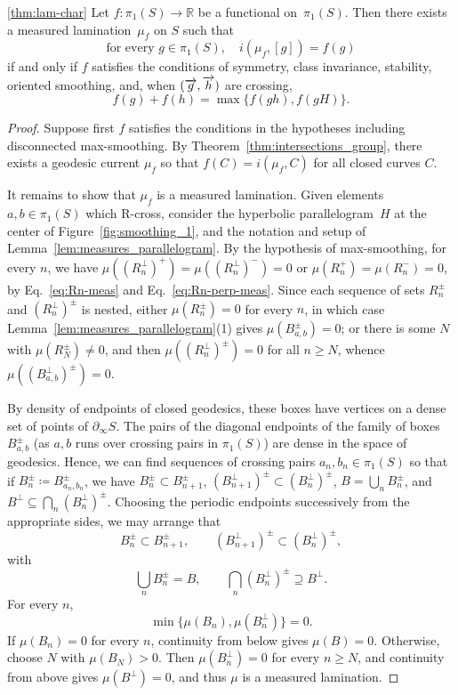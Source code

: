 \begin{taggedthm}{\ref{thm:lam-char}}
Let $f \colon \pi_1(S) \to \mathbb{R}$ be a functional on~$\pi_1(S)$.
Then there exists a measured lamination~$\mu_{f}$ on $S$ such that
\[
\text{for every } g\in \pi_1(S),\quad
i(\mu_{f},[g])=f(g)
\]
if and only if $f$ satisfies the conditions of symmetry, class invariance,
stability, oriented smoothing,
and, when $(\overrightarrow{g}, \overrightarrow{h})$ are crossing,
\[
f(g)+f(h)=\max\{f(gh),f(gH)\}.
\]
\end{taggedthm}

\begin{proof}
Suppose first $f$ satisfies the conditions in the hypotheses including
disconnected max-smoothing.
By Theorem~\ref{thm:intersections_group}, there exists a geodesic current $\mu_f$ so that $f(C)=i(\mu_f,C)$ for all closed curves $C$.

It remains to show that $\mu_f$ is a measured lamination.
Given elements $a, b \in \pi_1(S)$ which R-cross,
consider the hyperbolic parallelogram~$H$ at the center of
Figure~\ref{fig:smoothing_1}, and the notation and setup of Lemma~\ref{lem:measures_parallelogram}.
By the hypothesis of max-smoothing, for every $n$, we have $\mu((R_n^\perp)^+)=\mu((R_n^\perp)^-)=0$ or $\mu(R_n^{+})=\mu(R_n^{-})=0$, by Eq.~\eqref{eq:Rn-meas} and Eq.~\eqref{eq:Rn-perp-meas}.
Since each sequence of sets $R_n^{\pm}$ and $(R_n^{\perp})^{\pm}$ is
nested, either $\mu(R_n^{\pm}) = 0$ for every $n$, in which case
Lemma~\ref{lem:measures_parallelogram}(1) gives
$\mu(B_{a,b}^{\pm})=0$; or there is some $N$ with $\mu(R_N^{\pm}) \neq
0$, and then $\mu((R_n^{\perp})^{\pm})=0$ for all $n \geq N$, whence
$\mu((B_{a,b}^{\perp})^{\pm})=0$.

By density of endpoints of closed geodesics, these boxes have vertices on a dense set of points of $\partial_{\infty} S$.
The pairs of the diagonal endpoints of the family of boxes $B_{a,b}^{\pm}$ (as $a,b$ runs over crossing pairs in $\pi_1(S)$) are dense in the space of geodesics. Hence, we can find sequences of crossing pairs $a_n, b_n \in \pi_1(S)$ so that if $B_n^{\pm} \coloneqq B_{a_n, b_n}^{\pm}$, we have $B_n^{\pm} \subset B_{n+1}^{\pm}$, $(B_{n+1}^{\perp})^{\pm} \subset (B_{n}^{\perp})^{\pm}$, $B=\bigcup_n B_n^{\pm}$, and $B^\perp \subseteq \bigcap_n (B_n^{\perp})^{\pm}$.
Choosing the periodic endpoints successively from the appropriate
sides, we may arrange that
\[
B_n^\pm\subset B_{n+1}^\pm,\qquad
(B_{n+1}^\perp)^\pm\subset(B_n^\perp)^\pm,
\]
with
\[
\bigcup_n B_n^\pm=B,\qquad
\bigcap_n(B_n^\perp)^\pm\supseteq B^\perp.
\] For every $n$,
\[
\min\{\mu(B_n),\mu(B_n^\perp)\}=0.
\]
If $\mu(B_n)=0$ for every $n$, continuity from below gives
$\mu(B)=0$. Otherwise, choose $N$ with $\mu(B_N)>0$. Then
$\mu(B_n^\perp)=0$ for every $n\ge N$, and continuity from above
gives $\mu(B^\perp)=0$, and thus $\mu$ is a measured lamination.


\end{proof}
